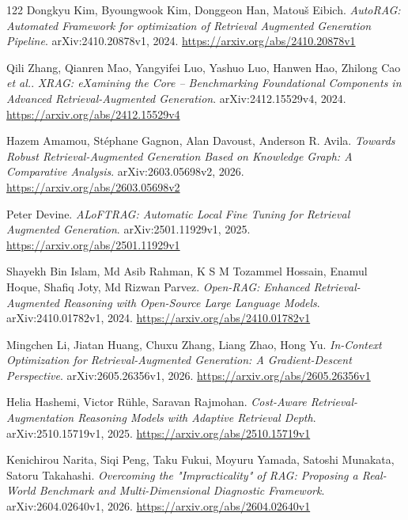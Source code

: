 \documentclass[11pt,a4paper]{article}
\begin{document}
\begin{thebibliography}{122}
Dongkyu Kim, Byoungwook Kim, Donggeon Han, Matou\v{s} Eibich.
\newblock \emph{AutoRAG: Automated Framework for optimization of Retrieval Augmented Generation Pipeline}.
\newblock arXiv:2410.20878v1, 2024.
\newblock \url{https://arxiv.org/abs/2410.20878v1}

Qili Zhang, Qianren Mao, Yangyifei Luo, Yashuo Luo, Hanwen Hao, Zhilong Cao \emph{et al.}.
\newblock \emph{XRAG: eXamining the Core -- Benchmarking Foundational Components in Advanced Retrieval-Augmented Generation}.
\newblock arXiv:2412.15529v4, 2024.
\newblock \url{https://arxiv.org/abs/2412.15529v4}

Hazem Amamou, St\'{e}phane Gagnon, Alan Davoust, Anderson R. Avila.
\newblock \emph{Towards Robust Retrieval-Augmented Generation Based on Knowledge Graph: A Comparative Analysis}.
\newblock arXiv:2603.05698v2, 2026.
\newblock \url{https://arxiv.org/abs/2603.05698v2}

Peter Devine.
\newblock \emph{ALoFTRAG: Automatic Local Fine Tuning for Retrieval Augmented Generation}.
\newblock arXiv:2501.11929v1, 2025.
\newblock \url{https://arxiv.org/abs/2501.11929v1}

Shayekh Bin Islam, Md Asib Rahman, K S M Tozammel Hossain, Enamul Hoque, Shafiq Joty, Md Rizwan Parvez.
\newblock \emph{Open-RAG: Enhanced Retrieval-Augmented Reasoning with Open-Source Large Language Models}.
\newblock arXiv:2410.01782v1, 2024.
\newblock \url{https://arxiv.org/abs/2410.01782v1}

Mingchen Li, Jiatan Huang, Chuxu Zhang, Liang Zhao, Hong Yu.
\newblock \emph{In-Context Optimization for Retrieval-Augmented Generation: A Gradient-Descent Perspective}.
\newblock arXiv:2605.26356v1, 2026.
\newblock \url{https://arxiv.org/abs/2605.26356v1}

Helia Hashemi, Victor R\"{u}hle, Saravan Rajmohan.
\newblock \emph{Cost-Aware Retrieval-Augmentation Reasoning Models with Adaptive Retrieval Depth}.
\newblock arXiv:2510.15719v1, 2025.
\newblock \url{https://arxiv.org/abs/2510.15719v1}

Kenichirou Narita, Siqi Peng, Taku Fukui, Moyuru Yamada, Satoshi Munakata, Satoru Takahashi.
\newblock \emph{Overcoming the "Impracticality" of RAG: Proposing a Real-World Benchmark and Multi-Dimensional Diagnostic Framework}.
\newblock arXiv:2604.02640v1, 2026.
\newblock \url{https://arxiv.org/abs/2604.02640v1}


\end{thebibliography}
\end{document}
